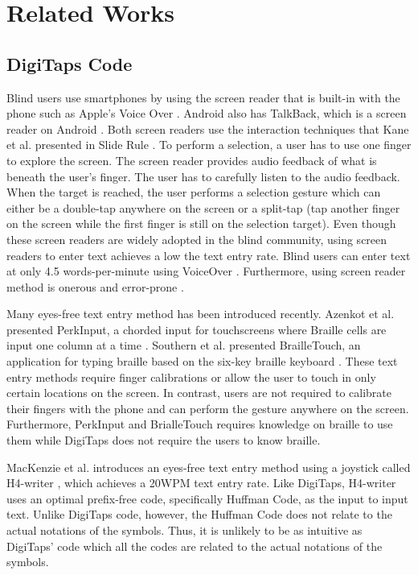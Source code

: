 \section{Related Works}
\label{sec:related}

\subsection{DigiTaps Code}
Blind users use smartphones by using the screen reader that is built-in with the phone such as Apple's Voice Over \cite{VoiceOver:2014}. Android also has TalkBack, which is a screen reader on Android \cite{TalkBack:2014}. Both screen readers use the interaction techniques that Kane et al. presented in Slide Rule \cite{Kane:2008}. To perform a selection, a user has to use one finger to explore the screen. The screen reader provides audio feedback of what is beneath the user's finger. The user has to carefully listen to the audio feedback. When the target is reached, the user performs a selection gesture which can either be a double-tap anywhere on the screen or a split-tap (tap another finger on the screen while the first finger is still on the selection target). Even though these screen readers are widely adopted in the blind community, using screen readers to enter text achieves a low the text entry rate. Blind users can enter text at only 4.5 words-per-minute using VoiceOver \cite{Azenkot:2012}. Furthermore, using screen reader method is onerous and error-prone \cite{Oliveira:2011}.

Many eyes-free text entry method has been introduced recently. Azenkot et al. presented PerkInput, a chorded input for touchscreens where Braille cells are input one column at a time \cite{Azenkot:2012}. Southern et al. presented BrailleTouch, an application for typing braille based on the six-key braille keyboard \cite{Southern:2012}. These text entry methods require finger calibrations or allow the user to touch in only certain locations on the screen. In contrast, users are not required to calibrate their fingers with the phone and can perform the gesture anywhere on the screen. Furthermore, PerkInput and BrialleTouch requires knowledge on braille to use them while DigiTaps does not require the users to know braille.

MacKenzie et al. introduces an eyes-free text entry method using a joystick called H4-writer \cite{MacKenzie:2011}, which achieves a 20WPM text entry rate. Like DigiTaps, H4-writer uses an optimal prefix-free code, specifically Huffman Code, as the input to input text. Unlike DigiTaps code, however, the Huffman Code does not relate to the actual notations of the symbols. Thus, it is unlikely to be as intuitive as DigiTaps' code which all the codes are related to the actual notations of the symbols.

